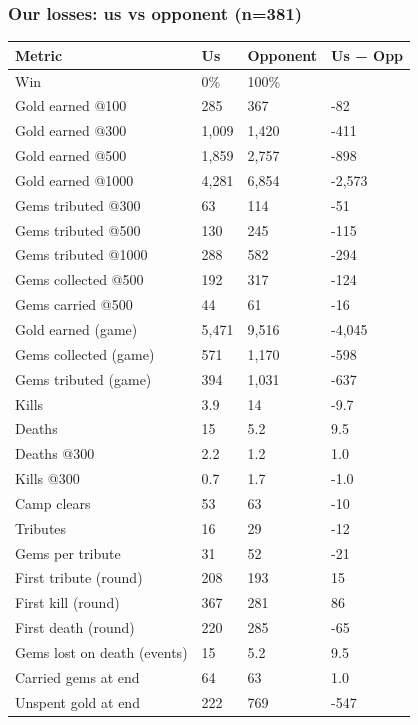 \documentclass[
  10pt,
]{article}
\newcounter{none} %
\begin{document}
\subsubsection{Our losses: us vs opponent
(n=381)}\label{our-losses-us-vs-opponent-n381}

{\def\LTcaptype{none} %
\begin{longtable}[]{@{}llll@{}}
\toprule\noalign{}
Metric & Us & Opponent & Us − Opp \\
\midrule\noalign{}
\endhead
\bottomrule\noalign{}
\endlastfoot
Win & 0\% & 100\% & \\
Gold earned @100 & 285 & 367 & -82 \\
Gold earned @300 & 1,009 & 1,420 & -411 \\
Gold earned @500 & 1,859 & 2,757 & -898 \\
Gold earned @1000 & 4,281 & 6,854 & -2,573 \\
Gems tributed @300 & 63 & 114 & -51 \\
Gems tributed @500 & 130 & 245 & -115 \\
Gems tributed @1000 & 288 & 582 & -294 \\
Gems collected @500 & 192 & 317 & -124 \\
Gems carried @500 & 44 & 61 & -16 \\
Gold earned (game) & 5,471 & 9,516 & -4,045 \\
Gems collected (game) & 571 & 1,170 & -598 \\
Gems tributed (game) & 394 & 1,031 & -637 \\
Kills & 3.9 & 14 & -9.7 \\
Deaths & 15 & 5.2 & 9.5 \\
Deaths @300 & 2.2 & 1.2 & 1.0 \\
Kills @300 & 0.7 & 1.7 & -1.0 \\
Camp clears & 53 & 63 & -10 \\
Tributes & 16 & 29 & -12 \\
Gems per tribute & 31 & 52 & -21 \\
First tribute (round) & 208 & 193 & 15 \\
First kill (round) & 367 & 281 & 86 \\
First death (round) & 220 & 285 & -65 \\
Gems lost on death (events) & 15 & 5.2 & 9.5 \\
Carried gems at end & 64 & 63 & 1.0 \\
Unspent gold at end & 222 & 769 & -547 \\

\end{longtable}}
\end{document}
